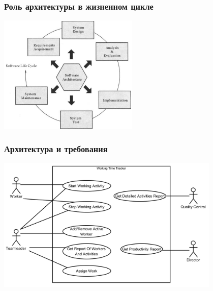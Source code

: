 \documentclass{../../slides-style}
\begin{document}
    \begin{frame}
        \frametitle{Роль архитектуры в жизненном цикле}
        \begin{center}
            \includegraphics[width=0.5\textwidth]{architectureLifeCycle.png}
        \end{center}
    \end{frame}

    \begin{frame}
        \frametitle{Архитектура и требования}
        \begin{center}
            \includegraphics[width=0.8\textwidth]{useCaseDiagram.png}
        \end{center}
    \end{frame}
\end{document}
